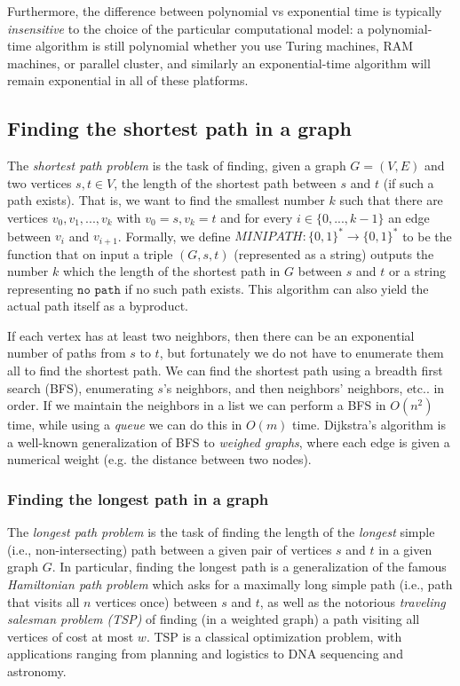 \documentclass[a4paper, 12pt]{report}
\theoremstyle{remark}
\theoremstyle{definition}
\begin{document}
Furthermore, the difference between polynomial vs exponential time is typically \textit{insensitive} to the choice of the particular computational model: a polynomial-time algorithm is still polynomial whether you use Turing machines, RAM machines, or parallel cluster, and similarly an exponential-time algorithm will remain exponential in all of these platforms. 

\subsection{Finding the shortest path in a graph}
The \textit{shortest path problem} is the task of finding, given a graph $G = (V, E)$ and two vertices $s, t \in V$, the length of the shortest path between $s$ and $t$ (if such a path exists). That is, we want to find the smallest number $k$ such that there are vertices $v_0, v_1, ..., v_k$ with $v_0 = s, v_k = t$ and for every $i \in \{0,..., k-1\}$ an edge between $v_i$ and $v_{i+1}$. Formally, we define $MINIPATH: \{0,1\}^* \longrightarrow \{0,1\}^*$ to be the function that on input a triple $(G, s, t)$ (represented as a string) outputs the number $k$ which the length of the shortest path in $G$ between $s$ and $t$ or a string representing $\texttt{no path}$ if no such path exists. This algorithm can also yield the actual path itself as a byproduct. 

If each vertex has at least two neighbors, then there can be an exponential number of paths from $s$ to $t$, but fortunately we do not have to enumerate them all to find the shortest path. We can find the shortest path using a breadth first search (BFS), enumerating $s$’s neighbors, and then neighbors’ neighbors, etc.. in order. If we maintain the neighbors in a list we can perform a BFS in $O(n^2)$ time, while using a \textit{queue} we can do this in $O(m)$ time. Dijkstra’s algorithm is a well-known generalization of BFS to \textit{weighed graphs}, where each edge is given a numerical weight (e.g. the distance between two nodes). 

\subsubsection{Finding the longest path in a graph}
The \textit{longest path problem} is the task of finding the length of the \textit{longest} simple (i.e., non-intersecting) path between a given pair of vertices $s$ and $t$ in a given graph $G$. In particular, finding the longest path is a generalization of the famous \textit{Hamiltonian path problem} which asks for a maximally long simple path (i.e., path that visits all $n$ vertices once) between $s$ and $t$, as well as the notorious \textit{traveling salesman problem (TSP)} of finding (in a weighted graph) a path visiting all vertices of cost at most $w$. TSP is a classical optimization problem, with applications ranging from planning and logistics to DNA sequencing and astronomy.
\end{document}
